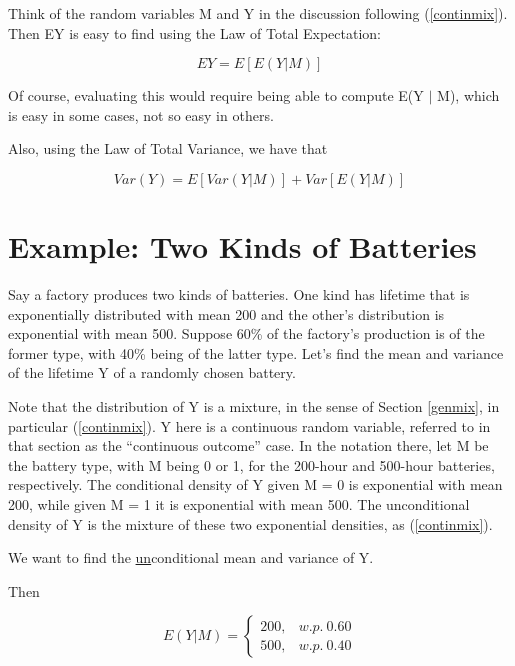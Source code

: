 Think of the random variables M and Y in the discussion following
(\ref{continmix}).  Then EY is easy to find using the Law of Total
Expectation:

\begin{equation}
\label{mixmean}
EY = E[E(Y | M)]
\end{equation}

Of course, evaluating this would require being able to compute E(Y $|$
M), which is easy in some cases, not so easy in others.

Also, using the Law of Total Variance, we have that

\begin{equation}
\label{mixvar}
Var(Y) = E[Var(Y|M)] + Var[E(Y|M)]
\end{equation}

\section{Example:  Two Kinds of Batteries}

Say a factory produces two kinds of batteries.  One kind has lifetime
that is exponentially distributed with mean 200 and the other's
distribution is exponential with mean 500.  Suppose 60\% of the
factory's production is of the former type, with 40\% being of the
latter type.  Let's find the mean and variance of the lifetime Y of a
randomly chosen battery.

Note that the distribution of Y is a mixture, in the sense of Section
\ref{genmix}, in particular (\ref{continmix}).  Y here is a continuous
random variable, referred to in that section as the ``continuous
outcome'' case.   In the notation there, let M be the battery type, with
M being 0 or 1, for the 200-hour and 500-hour batteries, respectively.
The conditional density of Y given M = 0 is exponential with mean 200,
while given M = 1 it is exponential with mean 500.  The unconditional
density of Y is the mixture of these two exponential densities, as 
(\ref{continmix}).

We want to find the \underline{un}conditional mean and variance of Y.

Then

\begin{equation}
\label{batt1}
E(Y|M)=\left\{ \begin{array}{rl}
200, & w.p. ~ 0.60 \\
500, & w.p. ~ 0.40
\end{array}\right. 
\end{equation}

